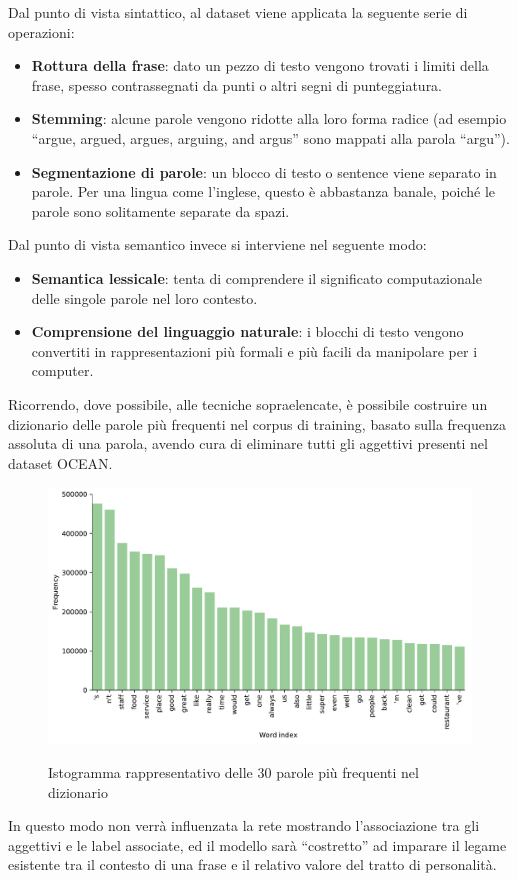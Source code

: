 Dal punto di vista sintattico, al dataset viene applicata la seguente serie di operazioni:
\begin{itemize}
	\item \textbf{Rottura della frase}: dato un pezzo di testo vengono trovati i limiti della frase, spesso contrassegnati da punti o altri segni di punteggiatura.
	\item \textbf{Stemming}: alcune parole vengono ridotte alla loro forma radice (ad esempio ``argue, argued, argues, arguing, and argus'' sono mappati alla parola ``argu'').
	\item \textbf{Segmentazione di parole}: un blocco di testo o sentence viene separato in parole. Per una lingua come l'inglese, questo è abbastanza banale, poiché le parole sono solitamente separate da spazi. 
\end{itemize}
Dal punto di vista semantico invece si interviene nel seguente modo:
\begin{itemize}
	\item \textbf{Semantica lessicale}: tenta di comprendere il significato computazionale delle singole parole nel loro contesto.
	\item \textbf{Comprensione del linguaggio naturale}: i blocchi di testo vengono convertiti in rappresentazioni più formali e più facili da manipolare per i computer. 
\end{itemize}
Ricorrendo, dove possibile, alle tecniche sopraelencate, è possibile costruire un dizionario delle  parole più frequenti nel corpus di training, basato sulla frequenza assoluta di una parola, avendo cura di eliminare tutti gli aggettivi presenti nel dataset OCEAN.

\begin{figure}[H]
	\centering
	{\includegraphics[width=.8\textwidth]{images/dict_histogram30}}
	\caption{Istogramma rappresentativo delle 30 parole più frequenti nel dizionario}
	\label{fig:Istrogramma del dizionario}
\end{figure}
In questo modo non verrà influenzata la rete mostrando l'associazione tra gli aggettivi e le label associate, ed il modello sarà ``costretto'' ad imparare il legame esistente tra il contesto di una frase e il relativo valore del tratto di personalità. 

